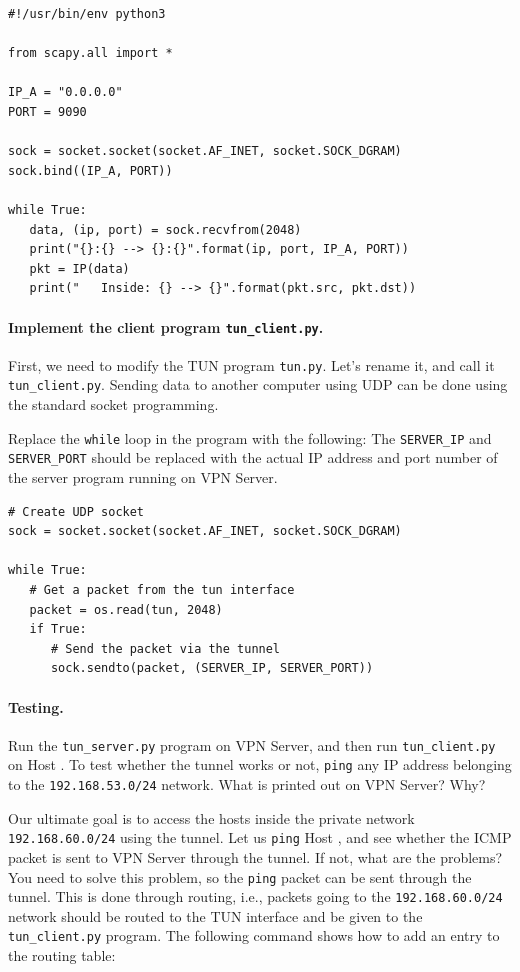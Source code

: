 \begin{lstlisting}[caption={\texttt{tun\_server.py}}, label=vpn:list:tun_server]
#!/usr/bin/env python3

from scapy.all import *

IP_A = "0.0.0.0"
PORT = 9090

sock = socket.socket(socket.AF_INET, socket.SOCK_DGRAM)
sock.bind((IP_A, PORT))

while True:
   data, (ip, port) = sock.recvfrom(2048)
   print("{}:{} --> {}:{}".format(ip, port, IP_A, PORT))
   pkt = IP(data)
   print("   Inside: {} --> {}".format(pkt.src, pkt.dst))
\end{lstlisting}



\paragraph{Implement the client program \texttt{tun\_client.py}.}
First, we need to modify the TUN program \texttt{tun.py}. Let's rename it, and call it 
\texttt{tun\_client.py}.  Sending data to another computer using UDP
can be done using the standard socket programming. 

Replace the \texttt{while} loop in the program with the following: 
The \texttt{SERVER\_IP} and \texttt{SERVER\_PORT} should be   
replaced with the actual IP address and port number of the server program running
on VPN Server.

\begin{lstlisting}
# Create UDP socket
sock = socket.socket(socket.AF_INET, socket.SOCK_DGRAM)

while True:
   # Get a packet from the tun interface
   packet = os.read(tun, 2048)
   if True:
      # Send the packet via the tunnel
      sock.sendto(packet, (SERVER_IP, SERVER_PORT))
\end{lstlisting}




\paragraph{Testing.} 
Run the \texttt{tun\_server.py} program on VPN Server, and then
run \texttt{tun\_client.py} on Host \hostu. To test whether the 
tunnel works or not,  \texttt{ping} any IP address belonging to the \texttt{192.168.53.0/24} network.  
What is printed out on VPN Server? Why? 


Our ultimate goal is to access the hosts inside the 
private network \texttt{192.168.60.0/24} using the tunnel. Let us 
\texttt{ping} Host \hostv, and see whether the ICMP packet is
sent to VPN Server through the tunnel. If not, what are the problems?
You need to solve this problem, so the \texttt{ping} packet can
be sent through the tunnel. This is done through routing, i.e., packets going to
the \texttt{192.168.60.0/24} network should be routed to the TUN interface and 
be given to the \texttt{tun\_client.py} program.  
The following command shows how to add an entry to the routing table:


